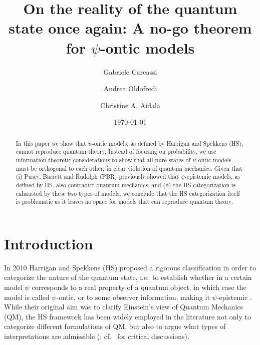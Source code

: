 \documentclass[10pt,twocolumn, nofootinbib]{revtex4-2}
\begin{document}
\title{On the reality of the quantum state once again: A no-go theorem for $\psi$-ontic models}
\author{Gabriele Carcassi}
\author{Andrea Oldofredi}
\author{Christine A. Aidala}
\vspace{2mm}

\date{\today}


\begin{abstract}
	In this paper we show that $\psi$-ontic models, as defined by Harrigan and Spekkens (HS), cannot reproduce quantum theory. Instead of focusing on probability, we use information theoretic considerations to show that all pure states of $\psi$-ontic models must be orthogonal to each other, in clear violation of quantum mechanics. Given that (i) Pusey, Barrett and Rudolph (PBR) previously showed that $\psi$-epistemic models, as defined by HS, also contradict quantum mechanics, and (ii) the HS categorization is exhausted by these two types of models, we conclude that the HS categorization itself is problematic as it leaves no space for models that can reproduce quantum theory.
\end{abstract}

\maketitle

\section{Introduction}
 
In 2010 Harrigan and Spekkens (HS) proposed a rigorous classification in order to categorize the nature of the quantum state, i.e.\ to establish whether in a certain model $\psi$ corresponds to a real property of a quantum object, in which case the model is called $\psi$-ontic, or to some observer information, making it $\psi$-epistemic \cite{Harrigan:2010}. While their original aim was to clarify Einstein's view of Quantum Mechanics (QM), the HS framework has been widely employed in the literature not only to categorize different formulations of QM, but also to argue what types of interpretations are admissible (\cite{Leifer:2013, Leifer:2017, Branciard:2014, Hermens:2021, Wood:2015, Ringbauer:2015, Mazurek:2016, Bartlett:2012}; cf.\ \cite{Oldofredi:2020b, Ladyman:2021} for critical discussions). 
\end{document}
